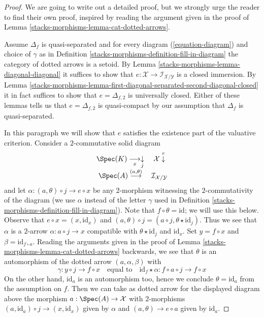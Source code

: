 \begin{proof}
We are going to write out a detailed proof, but we strongly urge the
reader to find their own proof, inspired by reading the argument
given in the proof of Lemma \ref{stacks-morphisms-lemma-cat-dotted-arrows}.

\medskip\noindent
Assume $\Delta_f$ is quasi-separated and for every diagram
(\ref{equation-diagram}) and choice of $\gamma$ as in
Definition \ref{stacks-morphisms-definition-fill-in-diagram}
the category of dotted arrows is a setoid.
By Lemma \ref{stacks-morphisms-lemma-diagonal-diagonal} it suffices to show that
$e : \mathcal{X} \to \mathcal{I}_{\mathcal{X}/\mathcal{Y}}$
is a closed immersion. By
Lemma \ref{stacks-morphisms-lemma-first-diagonal-separated-second-diagonal-closed}
it in fact suffices to show that $e = \Delta_{f, 2}$ is
universally closed.
Either of these lemmas tells us that $e = \Delta_{f, 2}$ is quasi-compact
by our assumption that $\Delta_f$ is quasi-separated.

\medskip\noindent
In this paragraph we will show that $e$ satisfies the existence
part of the valuative criterion. Consider a $2$-commutative solid diagram
$$
\begin{array}{cc}\Spec(K) \underset{x}{\longrightarrow}\underset{j}{\downarrow} & \mathcal{X} \overset{e}{\downarrow} \\ \Spec(A) \overset{(a, \theta)}{\longrightarrow} & \mathcal{I}_{\mathcal{X}/\mathcal{Y}}\end{array}
$$
and let $\alpha : (a, \theta) \circ j \to e \circ x$ be any $2$-morphism
witnessing the $2$-commutativity of the diagram (we use $\alpha$ instead
of the letter $\gamma$ used in Definition \ref{stacks-morphisms-definition-fill-in-diagram}).
Note that $f \circ \theta = \text{id}$; we will use this below.
Observe that $e \circ x = (x, \text{id}_x)$ and
$(a, \theta) \circ j = (a \circ j, \theta \star \text{id}_j)$.
Thus we see that $\alpha$ is a $2$-arrow $\alpha : a \circ j \to x$
compatible with $\theta \star \text{id}_j$ and $\text{id}_x$.
Set $y = f \circ x$ and $\beta = \text{id}_{f \circ a}$.
Reading the arguments given in the proof of
Lemma \ref{stacks-morphisms-lemma-cat-dotted-arrows}
backwards, we see that $\theta$ is an automorphism of the
dotted arrow $(a, \alpha, \beta)$ with
$$
\gamma : y \circ j \to f \circ x
\quad\text{equal to}\quad
\text{id}_f \star \alpha : f \circ a \circ j \to f \circ x
$$
On the other hand, $\text{id}_a$ is an automorphism too, hence
we conclude $\theta = \text{id}_a$ from the assumption on $f$.
Then we can take as dotted arrow for the displayed diagram above
the morphism $a : \Spec(A) \to \mathcal{X}$ with $2$-morphisms
$(a, \text{id}_a) \circ j \to (x, \text{id}_x)$ given by $\alpha$
and $(a, \theta) \to e \circ a$ given by $\text{id}_a$.


\end{proof}
